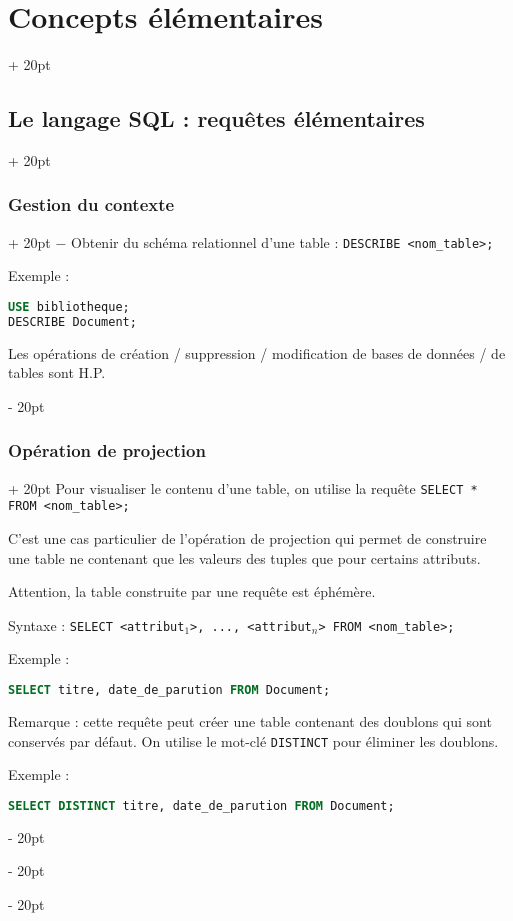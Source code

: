 \documentclass[a4paper, 12pt, twoside]{article}
\newcommand{\ind}[1][20pt]{\advance\leftskip + #1}
\newcommand{\deind}[1][20pt]{\advance\leftskip - #1}
\newenvironment{indt}[2][20pt]{#2 \par \ind[#1]}{\par \deind} %
\begin{document}
\begin{indt}{\section{Concepts élémentaires}}
\begin{indt}{\subsection{Le langage SQL : requêtes élémentaires}}
\begin{indt}{\subsubsection{Gestion du contexte}}
                $-$ Obtenir du schéma relationnel d'une table : \texttt{DESCRIBE <nom\_table>;}
                
                Exemple :
                
                \begin{lstlisting}[language=SQL, xleftmargin=80pt]
USE bibliotheque;
DESCRIBE Document;\end{lstlisting}
                
                Les opérations de création / suppression / modification de bases de données / de tables sont H.P.
            \end{indt}
            
            \vspace{12pt}
            
            \begin{indt}{\subsubsection{Opération de projection}}
                Pour visualiser le contenu d'une table, on utilise la requête \texttt{SELECT * FROM <nom\_table>;}
                
                C'est une cas particulier de l'opération de projection qui permet de construire une table ne contenant que les valeurs des tuples que pour certains attributs.
                
                Attention, la table construite par une requête est éphémère.
                
                Syntaxe :
                \texttt{SELECT <attribut$_1$>, ..., <attribut$_n$> FROM <nom\_table>;}
                
                Exemple :
                \begin{lstlisting}[language=SQL, xleftmargin=80pt]
SELECT titre, date_de_parution FROM Document;\end{lstlisting}
                
                Remarque : cette requête peut créer une table contenant des doublons qui sont conservés par défaut. On utilise le mot-clé \texttt{DISTINCT} pour éliminer les doublons.
                
                Exemple :
                \begin{lstlisting}[language=SQL, xleftmargin=80pt]
SELECT DISTINCT titre, date_de_parution FROM Document;\end{lstlisting}
               

\end{indt}
\end{indt}
\end{indt}
\end{document}
